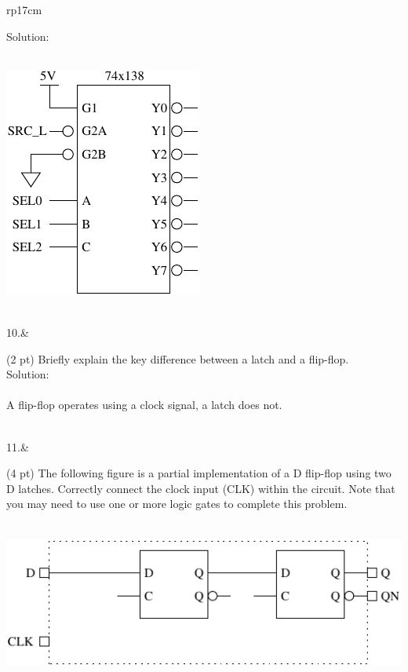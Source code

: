 \documentclass{article}
\begin{document}
\begin{longtable}[l]{rp{17cm}}
\begin{minipage}[t]{\linewidth}
Solution: \\ \\
\begin{center}
  \includegraphics{../Muxes/Assessments/74x138DMuxSchematic}
\end{center}
\end{minipage}\\
\medskip
10.&\begin{minipage}[t]{\linewidth}(2 pt) Briefly explain the key difference between a latch and a flip-flop. \\

Solution: \\ \\
A flip-flop operates using a clock signal, a latch does not. \\
\end{minipage}\\
\medskip
11.&\begin{minipage}[t]{\linewidth}(4 pt) The following figure is a partial implementation of a D flip-flop using two D latches.  Correctly connect the clock input (CLK) within the circuit.  Note that you may need to use one or more logic gates to complete this problem. \\ \\
\begin{center}
  \includegraphics{../LatchesAndFlipFlops/Assessments/DFlipFlopLogicNoClock}
\end{center}


\end{minipage}
\end{longtable}
\end{document}

